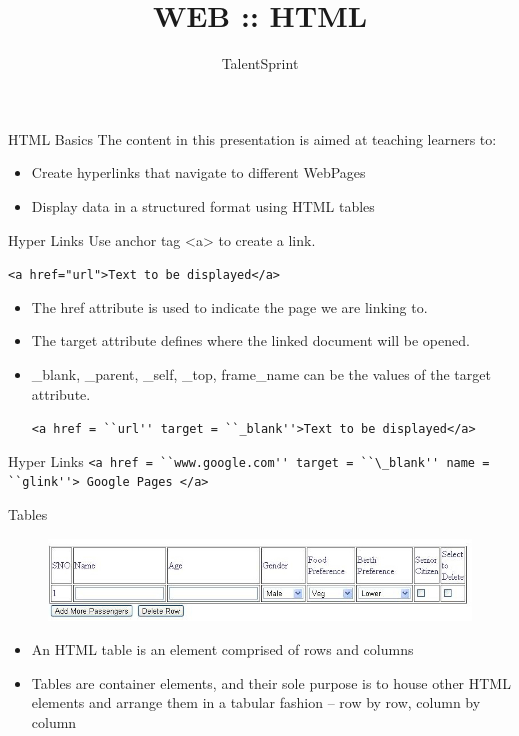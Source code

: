 \documentclass[14pt]{beamer}
\title{WEB :: HTML}
\author[TS]{TalentSprint}
\institute[L\&D]{Licensed To Skill}
\begin{document}
\begin{frame}
  \titlepage
\end{frame}

\begin{frame}{HTML Basics}
The content in this presentation is aimed at teaching  learners to:
  \begin{itemize}
  \item Create hyperlinks that navigate to different WebPages
  \item Display data in a structured format using HTML tables
  \end{itemize}
\end{frame}

\begin{frame}{Hyper Links}
Use anchor tag <a> to create a link.

\lstinline!<a href="url">Text to be displayed</a>!
\begin{itemize}
\item The href attribute is used to indicate the page we are linking to.
\item The target attribute defines where the linked document will be opened. 
\item \_blank, \_parent, \_self, \_top, frame\_name can be the values of the target attribute.

      \lstinline!<a href = ``url'' target = ``_blank''>Text to be displayed</a>!
\end{itemize}
\end{frame}

\begin{frame}{Hyper Links}
\lstinline!<a href = ``www.google.com'' target = ``\_blank'' name = ``glink''> Google Pages </a>!
\end{frame}

\begin{frame}{Tables}
 \begin{figure}[H]
  \centering
  \includegraphics[scale=.4]{s02-tables.png}
 \end{figure}
\begin{itemize}
 \item An HTML table is an element comprised of rows and columns
 \item Tables are container elements, and their sole purpose is to house other HTML elements and arrange them in a tabular fashion -- row by row, column by column
\end{itemize}
\end{frame}
\end{document}
